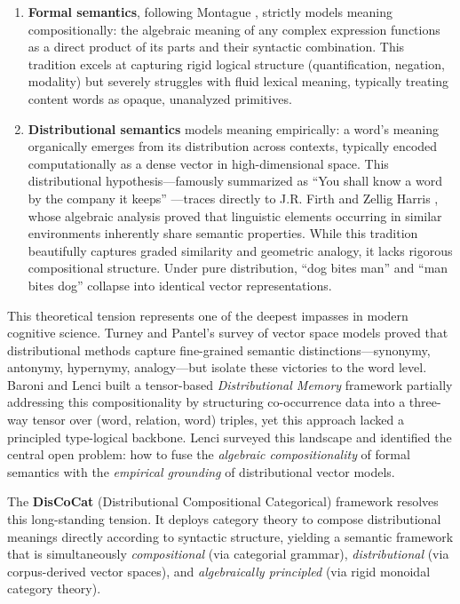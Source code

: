 \documentclass[
]{article}
\begin{document}
\begin{enumerate}
\def\labelenumi{\arabic{enumi}.}
\item
  \textbf{Formal semantics}, following Montague
  \citeyearpar{montague1973proper}, strictly models meaning
  compositionally: the algebraic meaning of any complex expression
  functions as a direct product of its parts and their syntactic
  combination. This tradition excels at capturing rigid logical
  structure (quantification, negation, modality) but severely struggles
  with fluid lexical meaning, typically treating content words as
  opaque, unanalyzed primitives.
\item
  \textbf{Distributional semantics} models meaning empirically: a word's
  meaning organically emerges from its distribution across contexts,
  typically encoded computationally as a dense vector in
  high-dimensional space. This distributional hypothesis---famously
  summarized as ``You shall know a word by the company it keeps''
  \citep{firth1957papers}---traces directly to J.R. Firth and Zellig
  Harris \citeyearpar{harris1954distributional}, whose algebraic
  analysis proved that linguistic elements occurring in similar
  environments inherently share semantic properties. While this
  tradition beautifully captures graded similarity and geometric
  analogy, it lacks rigorous compositional structure. Under pure
  distribution, ``dog bites man'' and ``man bites dog'' collapse into
  identical vector representations.
\end{enumerate}

This theoretical tension represents one of the deepest impasses in
modern cognitive science. Turney and Pantel's
\citeyearpar{turney2010frequency} survey of vector space models proved
that distributional methods capture fine-grained semantic
distinctions---synonymy, antonymy, hypernymy, analogy---but isolate
these victories to the word level. Baroni and Lenci
\citeyearpar{baroni2010distributional} built a tensor-based
\emph{Distributional Memory} framework partially addressing this
compositionality by structuring co-occurrence data into a three-way
tensor over (word, relation, word) triples, yet this approach lacked a
principled type-logical backbone. Lenci
\citeyearpar{lenci2018distributional} surveyed this landscape and
identified the central open problem: how to fuse the \emph{algebraic
compositionality} of formal semantics with the \emph{empirical
grounding} of distributional vector models.

The \textbf{DisCoCat} (Distributional Compositional Categorical)
framework \citep{coecke2010mathematical} resolves this long-standing
tension. It deploys category theory to compose distributional meanings
directly according to syntactic structure, yielding a semantic framework
that is simultaneously \emph{compositional} (via categorial grammar),
\emph{distributional} (via corpus-derived vector spaces), and
\emph{algebraically principled} (via rigid monoidal category theory).
\end{document}
